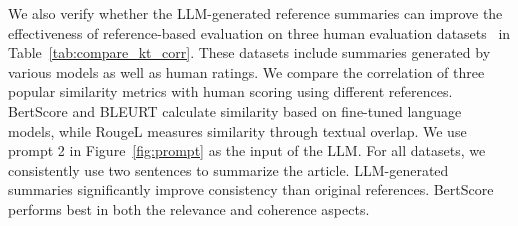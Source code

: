 We also verify whether the LLM-generated reference summaries can improve the effectiveness of reference-based evaluation on three human evaluation datasets~\cite{zhang2024benchmarking,fabbri2021summeval} in Table~\ref{tab:compare_kt_corr}. These datasets include summaries generated by various models as well as human ratings. We compare the correlation of three popular similarity metrics with human scoring using different references. BertScore and BLEURT calculate similarity based on fine-tuned language models, while RougeL measures similarity through textual overlap. We use prompt 2 in Figure~\ref{fig:prompt} as the input of the LLM. For all datasets, we consistently use two sentences to summarize the article. LLM-generated summaries significantly improve consistency than original references. BertScore performs best in both the relevance and coherence aspects.

